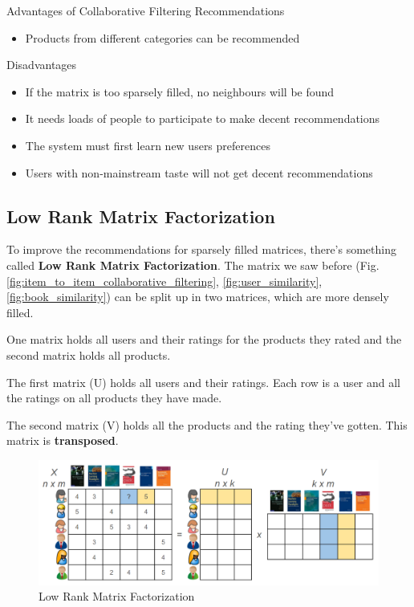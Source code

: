 \documentclass[11pt]{article}
\begin{document}
Advantages of Collaborative Filtering Recommendations

\begin{itemize}
    \item Products from different categories can be recommended
\end{itemize}

Disadvantages

\begin{itemize}
    \item If the matrix is too sparsely filled, no neighbours will be found
    \item It needs loads of people to participate to make decent recommendations
    \item The system must first learn new users preferences
    \item Users with non-mainstream taste will not get decent recommendations
\end{itemize}

\vspace{10px}

\subsection{Low Rank Matrix Factorization}
\label{sec:matrix_factorization}

To improve the recommendations for sparsely filled matrices, there's something called \textbf{Low Rank Matrix Factorization}. The matrix we saw before (Fig. \ref{fig:item_to_item_collaborative_filtering},
\ref{fig:user_similarity}, \ref{fig:book_similarity}) can be split up in two matrices, which are more densely filled.

One matrix holds all users and their ratings for the products they rated and the second matrix holds all products.


The first matrix (U) holds all users and their ratings. Each row is a user and all the ratings on all products they have made.

The second matrix (V) holds all the products and the rating they've gotten. This matrix is \textbf{transposed}.

\begin{figure}[htb!]
    \centering
    \includegraphics[keepaspectratio=true, width=\linewidth]{matrix_factorization.png}
    \caption{Low Rank Matrix Factorization}
    \label{fig:matrix_factorization}
\end{figure}
\end{document}
